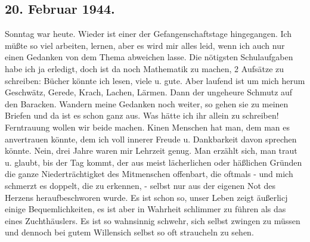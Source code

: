 \subsection{20. Februar 1944.}

Sonntag war heute.
Wieder ist einer der Gefangenschaftstage hingegangen.
Ich m\"{u}{\ss}te so viel arbeiten, lernen, aber es wird mir alles leid, wenn ich auch nur einen Gedanken von dem Thema abweichen lasse.
Die n\"{o}tigsten Schulaufgaben habe ich ja erledigt, doch ist da noch Mathematik zu machen, 2 Aufs\"{a}tze zu schreiben: B\"{u}cher k\"{o}nnte ich lesen, viele u. gute.
Aber laufend ist um mich herum Geschw\"{a}tz, Gerede, Krach, Lachen, L\"{a}rmen.
Dann der ungeheure Schmutz auf den Baracken.
Wandern meine Gedanken noch weiter, so gehen sie zu meinen Briefen und da ist es schon ganz aus.
Was h\"{a}tte ich ihr allein zu schreiben!
Ferntrauung wollen wir beide machen.
Kinen Menschen hat man, dem man es anvertrauen k\"{o}nnte, dem ich voll innerer Freude u. Dankbarkeit davon sprechen k\"{o}nnte.
Nein, drei Jahre waren mir Lehrzeit genug.
Man erz\"{a}hlt sich, man traut u. glaubt, bis der Tag kommt, der aus meist l\"{a}cherlichen oder h\"{a}{\ss}lichen Gr\"{u}nden die ganze Niedertr\"{a}chtigket des Mitmenschen offenbart, die oftmals - und mich schmerzt es doppelt, die zu erkennen, - selbst nur aus der eigenen  Not des Herzens heraufbeschworen wurde.
Es ist schon so, unser Leben zeigt \"{a}u{\ss}erlicj einige Bequemlichkeiten, es ist aber in Wahrheit schlimmer zu f\"{u}hren als das eines Zuchth\"{a}uslers.
Es ist so wahnsinnig schwehr, sich selbst zwingen zu m\"{u}ssen und dennoch bei gutem Willensich selbst so oft straucheln zu sehen.

\clearpage
